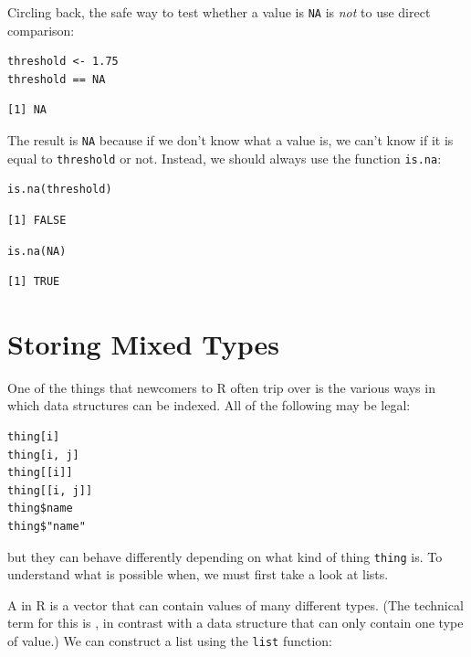 Circling back,
the safe way to test whether a value is \texttt{NA} is \emph{not} to use direct comparison:

\begin{lstlisting}
threshold <- 1.75
threshold == NA
\end{lstlisting}

\begin{lstlisting}
[1] NA
\end{lstlisting}

The result is \texttt{NA} because if we don't know what a value is,
we can't know if it is equal to \texttt{threshold} or not.
Instead,
we should always use the function \texttt{is.na}:

\begin{lstlisting}
is.na(threshold)
\end{lstlisting}

\begin{lstlisting}
[1] FALSE
\end{lstlisting}

\begin{lstlisting}
is.na(NA)
\end{lstlisting}

\begin{lstlisting}
[1] TRUE
\end{lstlisting}

\section{Storing Mixed Types}

One of the things that newcomers to R often trip over is
the various ways in which data structures can be indexed.
All of the following may be legal:

\begin{lstlisting}
thing[i]
thing[i, j]
thing[[i]]
thing[[i, j]]
thing$name
thing$"name"
\end{lstlisting}

\noindent
but they can behave differently depending on what kind of thing \texttt{thing} is.
To understand what is possible when,
we must first take a look at lists.

A  in R is a vector that can contain values of many different types.
(The technical term for this is ,
in contrast with a  data structure
that can only contain one type of value.)
We can construct a list using the \texttt{list} function:

